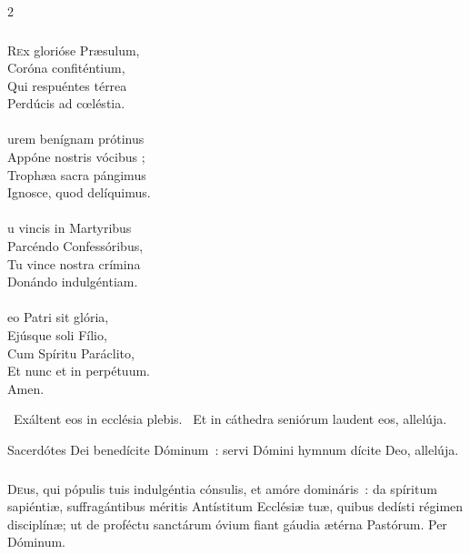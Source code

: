 \documentclass[9pt,twoside]{extarticle}
\begin{document}
\begin{multicols}{2}
{\subsubsection*{\center {}}
\lettrine{R}ex glorióse Præsulum,\\
Coróna confiténtium,\\
Qui respuéntes térrea\\
Perdúcis ad cœléstia.\\
\\
urem benígnam prótinus\\
Appóne nostris vócibus ;\\
Trophæa sacra pángimus\\
Ignosce, quod delíquimus.\\
\\
u vincis in Martyribus\\
Parcéndo Confessóribus,\\
Tu vince nostra crímina\\
Donándo indulgéntiam.\\
\\
eo Patri sit glória,\\
Ejúsque soli Fílio,\\
Cum Spíritu Paráclito,\\
Et nunc et in perpétuum.\\
Amen.

\begin{tightlist}{}
\item {}~Exáltent eos in ecclésia plebis. ~Et in cáthedra seniórum laudent eos, allelúja.
\item {} Sacerdótes Dei benedícite Dóminum~: servi Dómini hymnum dícite Deo, allelúja.
\end{tightlist}

\subsubsection*{\center {}}
\lettrine{D}eus, qui pópulis tuis indulgéntia cónsulis, et amóre domináris~: da spíritum sapiéntiæ, suffragántibus méritis Antístitum Ecclésiæ tuæ, quibus dedísti régimen disciplínæ; ut de proféctu sanctárum óvium fiant gáudia ætérna Pastórum. Per Dóminum.

\begin{tightlist}{}
\item {}
\end{tightlist}

}
\end{multicols}
\end{document}
